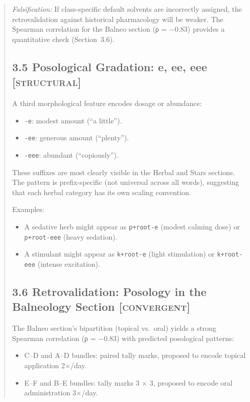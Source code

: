 \documentclass[11pt,a4paper]{article}
\begin{document}
\begin{abstract}
\textit{Falsification:} If class-specific default solvents are incorrectly assigned, the retrovalidation against historical pharmacology will be weaker. The Spearman correlation for the Balneo section (ρ = −0.83) provides a quantitative check (Section~3.6).

\subsection*{3.5 Posological Gradation: e, ee, eee \textsc{[structural]}}

A third morphological feature encodes dosage or abundance:

\begin{itemize}
\item \texttt{-e}: modest amount (``a little'').
\item \texttt{-ee}: generous amount (``plenty'').
\item \texttt{-eee}: abundant (``copiously'').
\end{itemize}

These suffixes are most clearly visible in the Herbal and Stars sections. The pattern is prefix-specific (not universal across all words), suggesting that each herbal category has its own scaling convention.

Examples:
\begin{itemize}
\item A sedative herb might appear as \texttt{p+root-e} (modest calming dose) or \texttt{p+root-eee} (heavy sedation).
\item A stimulant might appear as \texttt{k+root-e} (light stimulation) or \texttt{k+root-eee} (intense excitation).
\end{itemize}

\subsection*{3.6 Retrovalidation: Posology in the Balneology Section \textsc{[convergent]}}

The Balneo section's bipartition (topical vs.\ oral) yields a strong Spearman correlation (ρ = −0.83) with predicted posological patterns:

\begin{itemize}
\item C--D and A--D bundles: paired tally marks, proposed to encode topical application 2×/day.
\item E--F and B--E bundles: tally marks 3 × 3, proposed to encode oral administration 3×/day.
\end{itemize}


\end{abstract}
\end{document}
